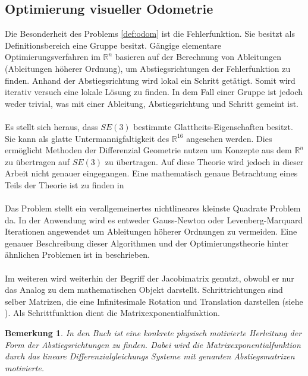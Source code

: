 \documentclass[12pt,DIV=15,BCOR=15mm,twoside,headsepline,abstract=true,listof=totoc,bibliography=totoc]{scrreprt}
\newtheorem{remark}{Bemerkung}[chapter]
\theoremstyle{remark}    %
\begin{document}
    \subsection{Optimierung visueller Odometrie}
    Die Besonderheit des Problems \ref{def:odom}  ist die Fehlerfunktion.
    Sie besitzt als Definitionsbereich eine Gruppe besitzt. Gängige elementare Optimierungsverfahren im $\mathbb{R}^n$ basieren auf der Berechnung von
    Ableitungen (Ableitungen höherer Ordnung), um Abstiegsrichtungen der Fehlerfunktion zu finden. Anhand der Abstiegsrichtung wird lokal
    ein Schritt getätigt. Somit wird iterativ versuch eine lokale Lösung zu finden.
    In dem Fall einer Gruppe ist jedoch weder trivial, was mit einer Ableitung, Abstiegsrichtung und Schritt gemeint ist. \\\\
    Es stellt sich heraus, dass $SE(3)$ bestimmte Glattheits-Eigenschaften besitzt. Sie kann als glatte Untermannigfaltigkeit des $\mathbb{R}^{16}$ angesehen werden. 
    Dies ermöglicht Methoden der Differenzial Geometrie nutzen um Konzepte aus dem $\mathbb{R}^n$ zu übertragen auf $SE(3)$ zu übertragen. 
    Auf diese Theorie wird jedoch in dieser Arbeit nicht genauer eingegangen. Eine mathematisch genaue Betrachtung eines Teils der Theorie ist zu finden in 
    \cite[Kap.9]{Lueck2005}\cite[Kap.8.4]{Absil2008}\cite[Kap.2] {Murray1994}\cite[Apd.A]{Murray1994}\\\\
    Das Problem stellt ein verallgemeinertes nichtlineares kleinste Quadrate Problem da. In der Anwendung wird es entweder Gauss-Newton oder Levenberg-Marquard
    Iterationen angewendet um Ableitungen höherer Ordnungen zu vermeiden. Eine genauer Beschreibung dieser Algorithmen und der Optimierungstheorie hinter 
    ähnlichen Problemen ist  in\cite[Kap.8.4]{Absil2008} beschrieben.\\\\
    Im weiteren wird weiterhin der Begriff der Jacobimatrix genutzt, obwohl er nur das Analog zu dem mathematischen Objekt darstellt.
    Schrittrichtungen sind selber Matrizen, die eine Infinitesimale Rotation und Translation darstellen (siehe \cite[Kap.2] {Murray1994}). Als Schrittfunktion dient 
    die Matrixexponentialfunktion.
    \begin{remark}
    In den Buch \cite[Kap.2] {Murray1994} ist eine konkrete physisch motivierte Herleitung der Form der Abstiegsrichtungen zu finden.
    Dabei wird die Matrixexponentialfunktion durch das lineare Differenzialgleichungs Systeme mit genanten Abstiegsmatrizen motivierte.
    \end{remark}
\end{document}
